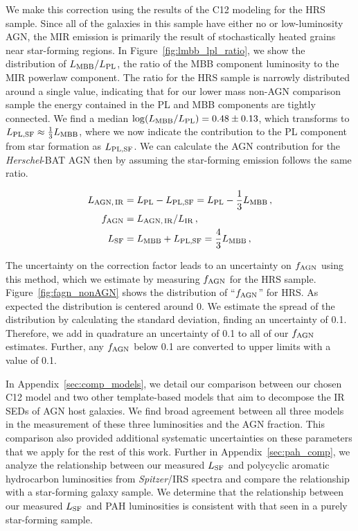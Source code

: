 \documentclass[fleqn, usenatbib]{mnras}
\newcommand{\herschel}{\emph{Herschel}}
\begin{document}
We make this correction using the results of the C12 modeling for the HRS sample. Since all of the galaxies in this sample have either no or low-luminosity AGN, the MIR emission is primarily the result of stochastically heated grains near star-forming regions. In Figure~\ref{fig:lmbb_lpl_ratio}, we show the distribution of $L_{\rm MBB}/L_{\rm PL}$, the ratio of the MBB component luminosity to the MIR powerlaw component. The ratio for the HRS sample is narrowly distributed around a single value, indicating that for our lower mass non-AGN comparison sample the energy contained in the PL and MBB components are tightly connected. We find a median $\log(L_{\rm MBB}/L_{\rm PL})=0.48 \pm 0.13$, which transforms to $L_{\rm PL,SF} \approx \frac{1}{3}L_{\rm MBB}$, where we now indicate the contribution to the PL component from star formation as  $L_{\rm PL,SF}$. We can calculate the AGN contribution for the \herschel-BAT AGN then by assuming the star-forming emission follows the same ratio.

\begin{align}
L_{\rm AGN,\,IR} &= L_{\rm PL} - L_{\rm PL, SF} = L_{\rm PL} - \frac{1}{3}L_{\rm MBB} \label{eq:c12_lagnIR}\,, \\
f_{\rm AGN} &= L_{\rm AGN, \, IR}/L_{\rm IR} \label{eq:c12_fagn}\,, \\
L_{\rm SF} &= L_{\rm MBB} + L_{\rm PL,SF} =  \frac{4}{3}L_{\rm MBB} \label{eq:c12_lsf}\,,
\end{align}

The uncertainty on the correction factor leads to an uncertainty on $f_{\rm AGN}$ using this method, which we estimate by measuring $f_{\rm AGN}$ for the HRS sample. Figure~\ref{fig:fagn_nonAGN} shows the distribution of ``$f_{\rm AGN}$'' for HRS. As expected the distribution is centered around 0. We estimate the spread of the distribution by calculating the standard deviation, finding an uncertainty of 0.1. Therefore, we add in quadrature an uncertainty of 0.1 to all of our $f_{\rm AGN}$ estimates. Further, any $f_{\rm AGN}$ below 0.1 are converted to upper limits with a value of 0.1. 
 
In Appendix~\ref{sec:comp_models}, we detail our comparison between our chosen C12 model and two other template-based models that aim to decompose the IR SEDs of AGN host galaxies. We find broad agreement between all three models in the measurement of these three luminosities and the AGN fraction. This comparison also provided additional systematic uncertainties on these parameters that we apply for the rest of this work. Further in Appendix~\ref{sec:pah_comp}, we analyze the relationship between our measured $L_{\rm SF}$ and polycyclic aromatic hydrocarbon luminosities from \textit{Spitzer}/IRS spectra and compare the relationship with a star-forming galaxy sample. We determine that the relationship between our measured $L_{\rm SF}$ and PAH luminosities is consistent with that seen in a purely star-forming sample.
 
\end{document}
